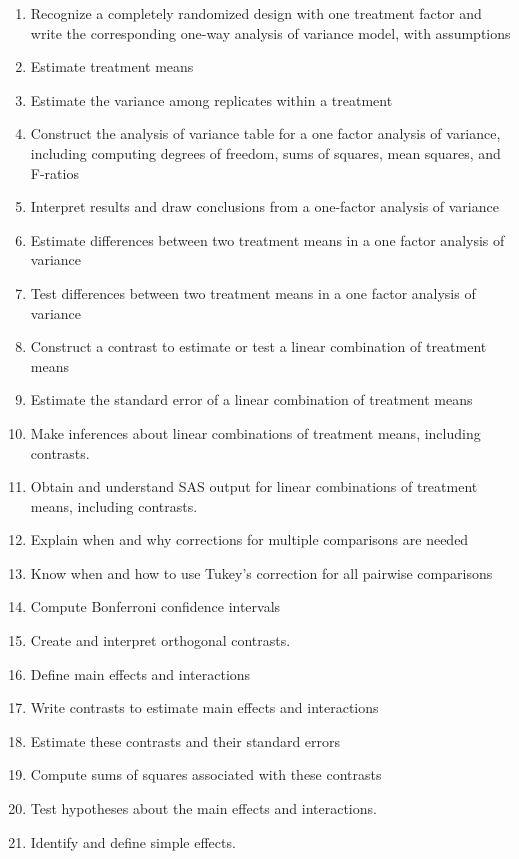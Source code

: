 \documentclass[]{book}
\theoremstyle{definition}
\theoremstyle{definition}
\theoremstyle{definition}
\theoremstyle{remark}
\begin{document}
\begin{enumerate}
\def\labelenumi{\arabic{enumi}.}
\item
  Recognize a completely randomized design with one treatment factor and
  write the corresponding one-way analysis of variance model, with
  assumptions
\item
  Estimate treatment means
\item
  Estimate the variance among replicates within a treatment
\item
  Construct the analysis of variance table for a one factor analysis of
  variance, including computing degrees of freedom, sums of squares,
  mean squares, and F-ratios
\item
  Interpret results and draw conclusions from a one-factor analysis of
  variance
\item
  Estimate differences between two treatment means in a one factor
  analysis of variance
\item
  Test differences between two treatment means in a one factor analysis
  of variance
\item
  Construct a contrast to estimate or test a linear combination of
  treatment means
\item
  Estimate the standard error of a linear combination of treatment means
\item
  Make inferences about linear combinations of treatment means,
  including contrasts.
\item
  Obtain and understand SAS output for linear combinations of treatment
  means, including contrasts.
\item
  Explain when and why corrections for multiple comparisons are needed
\item
  Know when and how to use Tukey's correction for all pairwise
  comparisons
\item
  Compute Bonferroni confidence intervals
\item
  Create and interpret orthogonal contrasts.
\item
  Define main effects and interactions
\item
  Write contrasts to estimate main effects and interactions
\item
  Estimate these contrasts and their standard errors
\item
  Compute sums of squares associated with these contrasts
\item
  Test hypotheses about the main effects and interactions.
\item
  Identify and define simple effects.

\end{enumerate}
\end{document}
